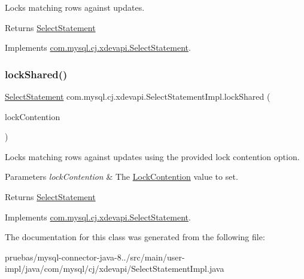 Locks matching rows against updates.

\begin{DoxyReturn}{Returns}
\mbox{\hyperlink{interfacecom_1_1mysql_1_1cj_1_1xdevapi_1_1_select_statement}{Select\+Statement}} 
\end{DoxyReturn}


Implements \mbox{\hyperlink{interfacecom_1_1mysql_1_1cj_1_1xdevapi_1_1_select_statement_aeee3b8b28d07cd0609e01164fda0bfd3}{com.\+mysql.\+cj.\+xdevapi.\+Select\+Statement}}.

\mbox{\label{classcom_1_1mysql_1_1cj_1_1xdevapi_1_1_select_statement_impl_a94383dd2bc539f35e3faa4de023248a1}} 
\subsubsection{\texorpdfstring{lock\+Shared()}{lockShared()}\hspace{0.1cm}{\footnotesize\ttfamily [2/2]}}
{\footnotesize\ttfamily \mbox{\hyperlink{interfacecom_1_1mysql_1_1cj_1_1xdevapi_1_1_select_statement}{Select\+Statement}} com.\+mysql.\+cj.\+xdevapi.\+Select\+Statement\+Impl.\+lock\+Shared (\begin{DoxyParamCaption}\item[{Lock\+Contention}]{lock\+Contention }\end{DoxyParamCaption})}

Locks matching rows against updates using the provided lock contention option.


\begin{DoxyParams}{Parameters}
{\em lock\+Contention} & The \mbox{\hyperlink{}{Lock\+Contention}} value to set. \\
\hline
\end{DoxyParams}
\begin{DoxyReturn}{Returns}
\mbox{\hyperlink{interfacecom_1_1mysql_1_1cj_1_1xdevapi_1_1_select_statement}{Select\+Statement}} 
\end{DoxyReturn}


Implements \mbox{\hyperlink{interfacecom_1_1mysql_1_1cj_1_1xdevapi_1_1_select_statement_a2ada4b9bb1be4e07ef8593ff9e777ad0}{com.\+mysql.\+cj.\+xdevapi.\+Select\+Statement}}.



The documentation for this class was generated from the following file\+:\begin{DoxyCompactItemize}
\item 
pruebas/mysql-\/connector-\/java-\/8../src/main/user-\/impl/java/com/mysql/cj/xdevapi/Select\+Statement\+Impl.\+java\end{DoxyCompactItemize}
